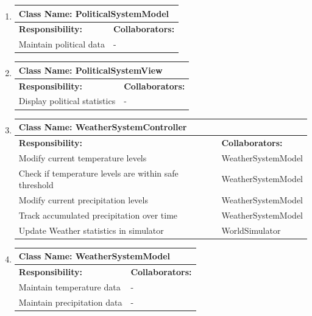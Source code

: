 \documentclass[]{article}
\begin{document}
\begin{enumerate}[1.]
\begin{tabular}{|p{10cm}|p{4cm}|}
	    \hline
	  \end{tabular}

	\item
	\begin{tabular}{|p{10cm}|p{4cm}|}
	    \hline
	     \multicolumn{2}{|l|}{\textbf{Class Name:  PoliticalSystemModel}} \\
	    \hline
	    \textbf{Responsibility:} & \textbf{Collaborators:} \\
	    \hline
			Maintain political data & - \\

	    \hline
	  \end{tabular}

	\item
	\begin{tabular}{|p{10cm}|p{4cm}|}
	    \hline
	     \multicolumn{2}{|l|}{\textbf{Class Name:  PoliticalSystemView}} \\
	    \hline
	    \textbf{Responsibility:} & \textbf{Collaborators:} \\
	    \hline
			Display political statistics & - \\

	    \hline
	  \end{tabular}

	\item
	\begin{tabular}{|p{10cm}|p{4cm}|}
	    \hline
	     \multicolumn{2}{|l|}{\textbf{Class Name:  WeatherSystemController}} \\
	    \hline
	    \textbf{Responsibility:} & \textbf{Collaborators:} \\
	    \hline
	    Modify current temperature levels & WeatherSystemModel \\
			Check if temperature levels are within safe threshold & WeatherSystemModel \\
			Modify current precipitation levels & WeatherSystemModel \\
			Track accumulated precipitation over time & WeatherSystemModel \\
			Update Weather statistics in simulator & WorldSimulator \\

	    \hline
	  \end{tabular}

	\item
	\begin{tabular}{|p{10cm}|p{4cm}|}
	    \hline
	     \multicolumn{2}{|l|}{\textbf{Class Name:  WeatherSystemModel}} \\
	    \hline
	    \textbf{Responsibility:} & \textbf{Collaborators:} \\
	    \hline
	    Maintain temperature data & - \\
			Maintain precipitation data & - \\


\end{tabular}
\end{enumerate}
\end{document}
